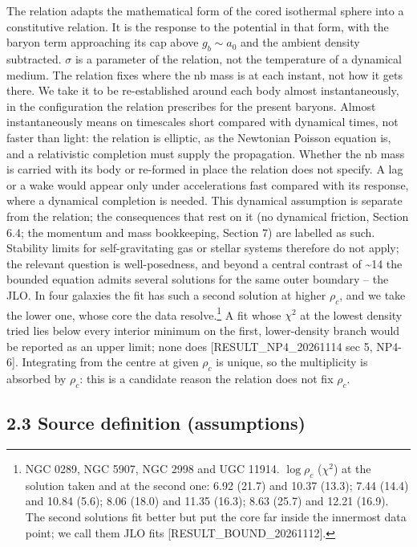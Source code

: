 \documentclass[
  10pt,
]{article}
\begin{document}
The relation adapts the mathematical form of the cored isothermal sphere into a constitutive relation. It is the response to the potential in that form, with the baryon term approaching its cap above $g_b\sim a_0$ and the ambient density subtracted. $\sigma$ is a parameter of the relation, not the temperature of a dynamical medium. The relation fixes where the nb mass is at each instant, not how it gets there. We take it to be re-established around each body almost instantaneously, in the configuration the relation prescribes for the present baryons. Almost instantaneously means on timescales short compared with dynamical times, not faster than light: the relation is elliptic, as the Newtonian Poisson equation is, and a relativistic completion must supply the propagation. Whether the nb mass is carried with its body or re-formed in place the relation does not specify. A lag or a wake would appear only under accelerations fast compared with its response, where a dynamical completion is needed. This dynamical assumption is separate from the relation; the consequences that rest on it (no dynamical friction, Section 6.4; the momentum and mass bookkeeping, Section 7) are labelled as such. Stability limits for self-gravitating gas or stellar systems therefore do not apply; the relevant question is well-posedness, and beyond a central contrast of \textasciitilde{}14 the bounded equation admits several solutions for the same outer boundary -- the JLO. In four galaxies the fit has such a second solution at higher $\rho_c$, and we take the lower one, whose core the data resolve.\footnote{NGC 0289, NGC 5907, NGC 2998 and UGC 11914. $\log\rho_c$ ($\chi^2$) at the solution taken and at the second one: 6.92 (21.7) and 10.37 (13.3); 7.44 (14.4) and 10.84 (5.6); 8.06 (18.0) and 11.35 (16.3); 8.63 (25.7) and 12.21 (16.9). The second solutions fit better but put the core far inside the innermost data point; we call them JLO fits {[}RESULT\_BOUND\_20261112{]}.} A fit whose $\chi^2$ at the lowest density tried lies below every interior minimum on the first, lower-density branch would be reported as an upper limit; none does {[}RESULT\_NP4\_20261114 sec 5, NP4-6{]}. Integrating from the centre at given $\rho_c$ is unique, so the multiplicity is absorbed by $\rho_c$: this is a candidate reason the relation does not fix $\rho_c$.

\subsection{2.3 Source definition (assumptions)}\label{source-definition-assumptions}
\end{document}
